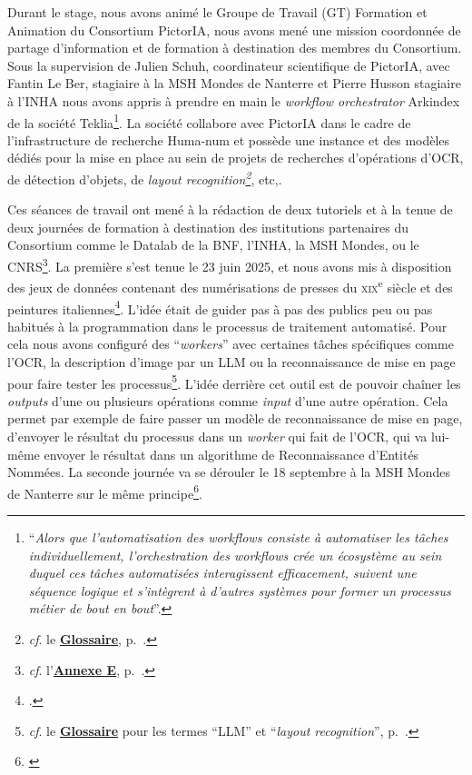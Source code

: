 Durant le stage, nous avons animé le Groupe de Travail (GT) Formation et Animation du Consortium PictorIA, nous avons mené une mission coordonnée de partage d'information et de formation à destination des membres du Consortium. Sous la supervision de Julien Schuh, coordinateur scientifique de PictorIA, avec Fantin Le Ber, stagiaire à la MSH Mondes de Nanterre et Pierre Husson stagiaire à l'INHA nous avons appris à prendre en main le \textit{workflow orchestrator} Arkindex de la société Teklia\footnote{\cite{noauthor_quest-ce_2025}\enquote{\textit{Alors que l’automatisation des workflows consiste à automatiser les tâches individuellement, l’orchestration des workflows crée un écosystème au sein duquel ces tâches automatisées interagissent efficacement, suivent une séquence logique et s’intègrent à d’autres systèmes pour former un processus métier de bout en bout}}.}. La société collabore avec PictorIA dans le cadre de l'infrastructure de recherche Huma-num et possède une instance et des modèles dédiés pour la mise en place au sein de projets de recherches d'opérations d'OCR, de détection d'objets, de \textit{layout recognition\footnote{\textit{cf}. le \textbf{\hyperref[sec:Glossaire]{Glossaire}}, p.~\pageref{sec:Glossaire}.
}}, etc,. 

Ces séances de travail ont mené à la rédaction de deux tutoriels et à la tenue de deux journées de formation à destination des institutions partenaires du Consortium comme le Datalab de la BNF, l'INHA, la MSH Mondes, ou le CNRS\footnote{\textit{cf}. l'\textbf{\hyperref[sec:Formations]{Annexe E}}, p.~\pageref{sec:Formations}.}. La première s'est tenue le 23 juin 2025, et nous avons mis à disposition des jeux de données contenant des numérisations de presses du \textsc{xix}\textsuperscript{e} siècle et des peintures italiennes\footnote{\cite{le_ber_tutoriel_2025-1}.}. L'idée était de guider pas à pas des publics peu ou pas habitués à la programmation dans le processus de traitement automatisé. Pour cela nous avons configuré des \enquote{\textit{workers}} avec certaines tâches spécifiques comme l'OCR, la description d'image par un LLM ou la reconnaissance de mise en page pour faire tester les processus\footnote{\textit{cf}. le \textbf{\hyperref[sec:Glossaire]{Glossaire}} pour les termes \enquote{LLM} et \enquote{\textit{layout recognition}}, p.~\pageref{sec:Glossaire}.}. L'idée derrière cet outil est de pouvoir chaîner les \textit{outputs} d'une ou plusieurs opérations comme \textit{input} d'une autre opération. Cela permet par exemple de faire passer un modèle de reconnaissance de mise en page, d'envoyer le résultat du processus dans un \textit{worker} qui fait de l'OCR, qui va lui-même envoyer le résultat dans un algorithme de Reconnaissance d'Entités Nommées. La seconde journée va se dérouler le 18 septembre à la MSH Mondes de Nanterre sur le même principe\footnote{\cite{schuh_seminaire-atelier_2025}}.

